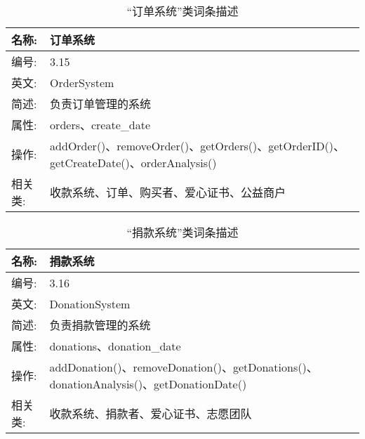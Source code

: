 \begin{table}[H]  
\caption{“订单系统”类词条描述}  
\begin{center}  
    \begin{tabular}{l p{11cm}} 
        \hline
        \quad 名称:  &  订单系统 \\
        \hline
        \quad 编号:  & 3.15 \\
        \hline
        \quad 英文:  &  OrderSystem \\
        \hline
        \quad 简述:  & 负责订单管理的系统 \\
        \hline
        \quad 属性:  & orders、create\_date\\
        \hline
        \quad 操作:  & addOrder()、removeOrder()、getOrders()、getOrderID()、getCreateDate()、orderAnalysis()\\
        \hline
        \quad 相关类:  & 收款系统、订单、购买者、爱心证书、公益商户 \\
        \hline
    \end{tabular}
\end{center}
\end{table}

\begin{table}[H]  
\caption{“捐款系统”类词条描述}  
\begin{center}  
    \begin{tabular}{l p{11cm}} 
        \hline
        \quad 名称:  &  捐款系统 \\
        \hline
        \quad 编号:  & 3.16 \\
        \hline
        \quad 英文:  &  DonationSystem \\
        \hline
        \quad 简述:  & 负责捐款管理的系统 \\
        \hline
        \quad 属性:  & donations、donation\_date\\
        \hline
        \quad 操作:  & addDonation()、removeDonation()、getDonations()、donationAnalysis()、getDonationDate()\\
        \hline
        \quad 相关类:  & 收款系统、捐款者、爱心证书、志愿团队 \\
        \hline
    \end{tabular}
\end{center}
\end{table}